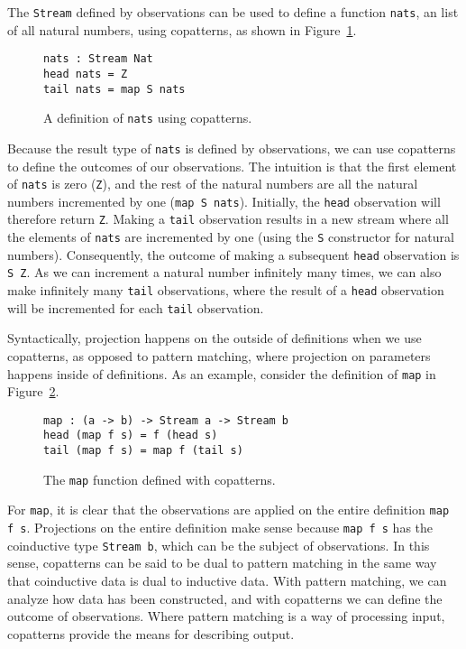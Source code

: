 The \texttt{Stream} defined by observations can be used to define a function
\texttt{nats}, an list of all natural numbers, using copatterns, as shown in
Figure~\ref{fig:nats_copatterns}.


\begin{figure}[h]
\begin{lstlisting}[mathescape]
nats : Stream Nat
head nats = Z
tail nats = map S nats
\end{lstlisting}
\caption{A definition of \texttt{nats} using copatterns.}
\label{fig:nats_copatterns}
\end{figure}

Because the result type of \texttt{nats} is defined by observations, we can use
copatterns to define the outcomes of our observations. The intuition is that the
first element of \texttt{nats} is zero (\texttt{Z}), and the rest of the natural
numbers are all the natural numbers incremented by one (\texttt{map S
  nats}). Initially, the \texttt{head} observation will therefore return
\texttt{Z}. Making a \texttt{tail} observation results in a new stream where all
the elements of \texttt{nats} are incremented by one (using the \texttt{S}
constructor for natural numbers). Consequently, the outcome of making a
subsequent \texttt{head} observation is \texttt{S Z}. As we can increment a
natural number infinitely many times, we can also make infinitely many
\texttt{tail} observations, where the result of a \texttt{head} observation will
be incremented for each \texttt{tail} observation. 


Syntactically, projection happens on the outside of definitions when we use
copatterns, as opposed to pattern matching, where projection on parameters
happens inside of definitions. As an example, consider the definition of
\texttt{map} in Figure~\ref{fig:map_copatterns}.


\begin{figure}[h]
\begin{lstlisting}[mathescape]
map : (a -> b) -> Stream a -> Stream b
head (map f s) = f (head s)
tail (map f s) = map f (tail s)
\end{lstlisting}
\caption{The \texttt{map} function defined with copatterns.}
\label{fig:map_copatterns}
\end{figure}

For \texttt{map}, it is clear that the observations are applied on the entire
definition \texttt{map f s}. Projections on the entire definition make sense
because \texttt{map f s} has the coinductive type \texttt{Stream b}, which can
be the subject of observations. In this sense, copatterns can be said to be dual
to pattern matching in the same way that coinductive data is dual to inductive
data. With pattern matching, we can analyze how data has been constructed, and
with copatterns we can define the outcome of observations. Where pattern
matching is a way of processing input, copatterns provide the means for
describing output. 

